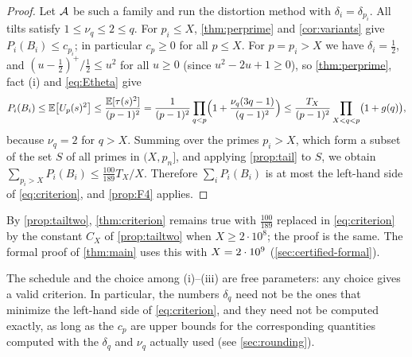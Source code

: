 \begin{proof}
Let $\mathcal{A}$ be such a family and run the distortion method with $\delta_i=\delta_{p_i}$. All tilts satisfy
$1\le\nu_q\le2\le q$. For $p_i\le X$, \cref{thm:perprime} and \cref{cor:variants} give $P_i(B_i)\le c_{p_i}$; in
particular $c_p\ge0$ for all $p\le X$. For $p=p_i>X$ we have $\delta_i=\frac12$, and
$(u-\frac12)^+/\frac12\le u^2$ for all $u\ge0$ (since $u^2-2u+1\ge0$), so \cref{thm:perprime}, fact (i) and
\eqref{eq:Etheta} give
\[
  P_i(B_i)\le\mathbb{E}\bigl[U_p(s)^2\bigr]\le\frac{\mathbb{E}[\tau(s)^2]}{(p-1)^2}
  =\frac1{(p-1)^2}\prod_{q<p}\Bigl(1+\frac{\nu_q(3q-1)}{(q-1)^2}\Bigr)
  \le\frac{T_X}{(p-1)^2}\prod_{X<q<p}\bigl(1+g(q)\bigr),
\]
because $\nu_q=2$ for $q>X$. Summing over the primes $p_i>X$, which form a subset of the set $S$ of all primes in
$(X,p_n]$, and applying \cref{prop:tail} to $S$, we obtain $\sum_{p_i>X}P_i(B_i)\le\frac{100}{189}T_X/X$.
Therefore $\sum_iP_i(B_i)$ is at most the left-hand side of \eqref{eq:criterion}, and \cref{prop:F4} applies.
\end{proof}

\begin{remark}\label{rem:criterion-sharp}
By \cref{prop:tailtwo}, \cref{thm:criterion} remains true with $\frac{100}{189}$ replaced in \eqref{eq:criterion} by
the constant $C_X$ of \cref{prop:tailtwo} when $X\ge2\cdot10^8$; the proof is the same. The formal proof of
\cref{thm:main} uses this with $X=2\cdot10^{9}$ (\cref{sec:certified-formal}).
\end{remark}

\begin{remark}\label{rem:any-schedule}
The schedule and the choice among (i)--(iii) are free parameters: any choice gives a valid criterion. In
particular, the numbers $\delta_q$ need not be the ones that minimize the left-hand side of \eqref{eq:criterion},
and they need not be computed exactly, as long as the $c_p$ are upper bounds for the corresponding quantities
computed with the $\delta_q$ and $\nu_q$ actually used (see \cref{sec:rounding}).
\end{remark}

